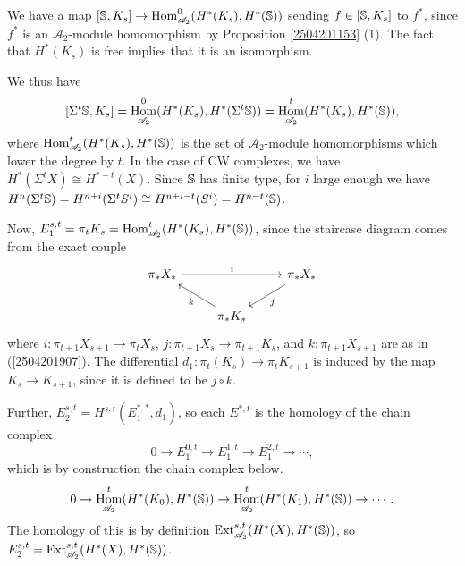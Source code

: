 \documentclass[11pt, titlepage]{article} %
\def\bb{\ensuremath\mathbb}
\def\A{\ensuremath{\mathscr{A}_2}}
\DeclareMathOperator{\Ext}{Ext}
\DeclareMathOperator{\Hom}{Hom}
\def\textcolour{\textcolor}
\numberwithin{equation}{subsection}
\theoremstyle{plain}
\theoremstyle{definition}
\begin{document}
We have a map \([\bb{S}, K_s]\to \Hom_{\A}^0(H^*(K_s), H^*(\bb{S}))\) sending \(f \in [\bb{S}, K_s]\) to \(f^*\), since \(f^*\) is an \(\A\)-module homomorphism by Proposition \ref{2504201153} (1). The fact that \(H^*(K_s)\) is free implies that it is an isomorphism.

We thus have
\[[\Sigma^t \bb{S}, K_s]=\Hom^0_{\A}(H^*(K_s), H^*(\Sigma^t \bb{S}))=\Hom^t_{\A}(H^*(K_s), H^*(\bb{S})),\]
where \(\Hom^t_{\A}(H^*(K_s), H^*(\bb{S}))\) is the set of \(\A\)-module homomorphisms which lower the degree by \(t\). In the case of CW complexes, we have \(H^*(\Sigma^t X)\cong H^{*-t}(X)\). Since \(\bb{S}\) has finite type, for \(i\) large enough we have \(H^n(\Sigma^t\bb{S})=H^{n+i}(\Sigma^t S^i)\cong H^{n+i-t}(S^i)=H^{n-t}(\bb{S})\).

Now, \(E_1^{s,t} = \pi_t K_s =\Hom^t_{\A}(H^*(K_s), H^*(\bb{S}))\), since the staircase diagram comes from %
the exact couple
\[\begin{tikzcd}
 \pi_*X_* \arrow[rr, "i"] & & \pi_* X_* \arrow[dl, "j"] \\ 
 & \pi_*K_* \arrow[ul, "k"] & 
 \end{tikzcd}\]
where \(i : \pi_{t+1}X_{s+1}\to \pi_tX_s\), \(j : \pi_{t+1}X_s \to \pi_{t+1}K_s\), and \(k : \pi_{t+1}X_{s+1}\) are as in (\ref{2504201907}). The differential \(d_1 : \pi_t(K_s)\to\pi_t K_{s+1}\) is induced by the map \(K_s \to K_{s+1}\), since it is defined to be \(j\circ k\).

Further, \(E^{s,t}_2=H^{s,t}(E_1^{*,*}, d_1)\), so each \(E^{*, t}\) is the homology of the chain complex
\[0 \to E^{0,t}_1 \to E^{1,t}_1\to E^{2,t}_1\to \cdots,\]
which is by construction the chain complex below.
\[0 \to \Hom^t_{\A}(H^*(K_0), H^*(\bb{S}))\to \Hom^t_{\A}(H^*(K_1), H^*(\bb{S}))\to \cdots.\]
The homology of this is by definition \(\Ext_{\A}^{s,t}(H^*(X), H^*(\bb{S}))\), so \(E_2^{s,t}=\Ext^{s,t}_{\A}(H^*(X), H^*(\bb{S}))\).
\end{document}
